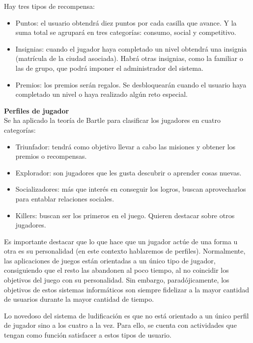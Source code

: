 \documentclass[twoside]{report}
\begin{document}
Hay tres tipos de recompensa:
\begin{itemize}

\item Puntos: el usuario obtendrá diez puntos por cada casilla que avance. Y la suma total se agrupará en tres categorías: consumo, social y competitivo.

\item Insignias: cuando el jugador haya completado un nivel obtendrá una insignia (matrícula de la ciudad asociada). Habrá otras insignias, como la familiar o las de grupo, que podrá imponer el administrador del sistema.

\item Premios: los premios serán regalos. Se desbloquearán cuando el usuario haya completado un nivel o haya realizado algún reto especial.

\end{itemize}

\textbf{Perfiles de jugador\cite{iebsctj}}\\ 

Se ha aplicado la teoría de Bartle\cite{iebsctj} para clasificar los jugadores en cuatro categorías:
\begin{itemize}

\item Triunfador: tendrá como objetivo llevar a cabo las misiones y obtener los premios o recompensas.
\item Explorador: son jugadores que les gusta descubrir o aprender cosas nuevas.
\item Socializadores: más que interés en conseguir los logros, buscan aprovecharlos para entablar relaciones sociales.
\item Killers: buscan ser los primeros en el juego. Quieren destacar sobre otros jugadores.

\end{itemize}

Es importante destacar que lo que hace que un jugador actúe de una forma u otra es su personalidad (en este contexto hablaremos de perfiles). Normalmente, las aplicaciones de juegos están orientadas a un único tipo de jugador, consiguiendo que el resto las abandonen al poco tiempo, al no coincidir los objetivos del juego con su personalidad. Sin embargo, paradójicamente, los objetivos de estos sistemas informáticos son siempre fidelizar a la mayor cantidad de usuarios durante la mayor cantidad de tiempo.

Lo novedoso del sistema de ludificación es que no está orientado a un único perfil de jugador sino a los cuatro a la vez. Para ello, se cuenta con actividades que tengan como función satisfacer a estos tipos de usuario. \\
\end{document}
